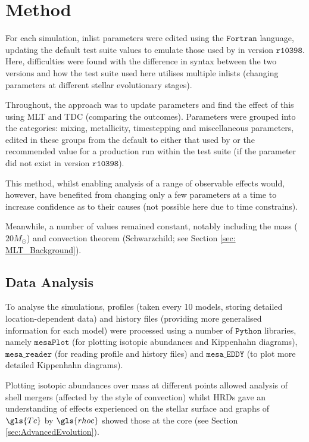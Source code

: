 \section{Method}\label{sec:Method}
For each simulation, inlist parameters were edited using the $\texttt{Fortran}$ language, updating the default test suite values to emulate those used by  in version $\texttt{r10398}$. Here, difficulties were found with the difference in syntax between the two versions and how the test suite used here utilises multiple inlists (changing parameters at different stellar evolutionary stages). 

Throughout, the approach was to update parameters and find the effect of this using \gls{MLT} and \gls{TDC} (comparing the outcomes). Parameters were grouped into the categories: mixing, metallicity, timestepping and miscellaneous parameters, edited in these groups from the default to either that used by \citeauthor{Whitehead} or the recommended value for a production run within the test suite (if the parameter did not exist in version $\texttt{r10398}$). 

This method, whilst enabling analysis of a range of observable effects would, however, have benefited from changing only a few parameters at a time to increase confidence as to their causes (not possible here due to time constrains).

Meanwhile, a number of values remained constant, notably including the mass ($20M_{\odot}$) and convection theorem (Schwarzchild; see Section \ref{sec: MLT_Background}).

\subsection{Data Analysis}

To analyse the simulations, profiles (taken every 10 models, storing detailed location-dependent data) and history files (providing more generalised information for each model) were processed using a number of $\texttt{Python}$ libraries, namely $\texttt{mesaPlot}$ (for plotting isotopic abundances and Kippenhahn diagrams), $\texttt{mesa\_reader}$ (for reading profile and history files) and $\texttt{mesa\_EDDY}$ (to plot more detailed Kippenhahn diagrams).

Plotting isotopic abundances over mass at different points allowed analysis of shell mergers (affected by the style of convection) whilst \glspl{HRD} gave an understanding of effects experienced on the stellar surface and graphs of $\gls{Tc}$ by $\gls{rhoc}$ showed those at the core (see Section \ref{sec:AdvancedEvolution}).

